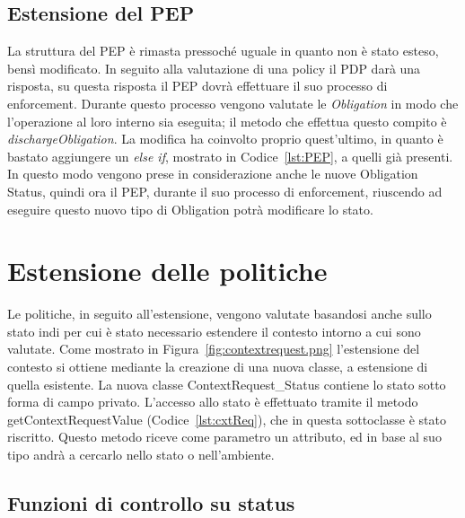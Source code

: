 \subsection{Estensione del PEP}
\label{sub:estensione_PEP}
La struttura del \ac{PEP} è rimasta pressoché uguale in quanto non è stato esteso, bensì modificato.
In seguito alla valutazione di una policy il \ac{PDP} darà una risposta, su questa risposta il \ac{PEP} dovrà effettuare il suo processo di enforcement.
Durante questo processo vengono valutate le \textit{Obligation} in modo che l'operazione al loro interno sia eseguita; il metodo che effettua questo compito è 
\textit{dischargeObligation}. La modifica ha coinvolto proprio quest'ultimo, in quanto è bastato aggiungere un \textit{else if}, mostrato in Codice~\ref{lst:PEP}, a quelli già presenti.
In questo modo vengono prese in considerazione anche le nuove Obligation Status, quindi ora il \ac{PEP}, durante il suo processo di enforcement, riuscendo ad eseguire questo nuovo tipo di Obligation potrà modificare lo stato.


\section{Estensione delle politiche}
\label{sec:estensione_politiche}

Le politiche, in seguito all'estensione, vengono valutate basandosi anche sullo stato indi per cui è stato necessario estendere il contesto intorno a cui sono valutate. Come mostrato in Figura~\ref{fig:contextrequest.png} l'estensione del contesto si ottiene mediante la creazione di una nuova classe, a estensione di quella esistente.
La nuova classe ContextRequest\_Status contiene lo stato sotto forma di campo privato. L'accesso allo stato è effettuato tramite il metodo getContextRequestValue (Codice~\ref{lst:cxtReq}), che in questa sottoclasse è stato riscritto.
Questo metodo riceve come parametro un attributo, ed in base al suo tipo andrà a cercarlo nello stato o nell'ambiente.

\subsection{Funzioni di controllo su status}
\label{sub:funzioni_controllo_status}

